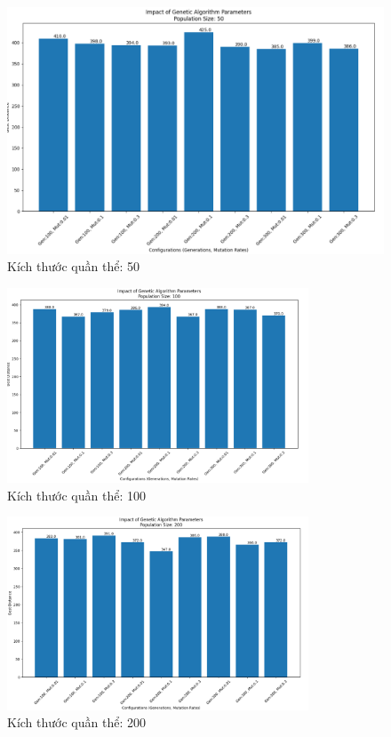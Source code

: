 \documentclass[14pt]{article}
\begin{document}
	\begin{center}
	 	\begin{figure}[htbp]
	 		\centering
	 		\includegraphics[width=\textwidth]{./Image/population_size_50.png}
	 		\caption{Kích thước quần thể: 50}
	 		\label{fig:mylabel}
	 	\end{figure}
	 	\begin{figure}[htbp]
	 		\centering
	 		\includegraphics[width=0.8\textwidth]{./Image/population_size_100.png}
	 		\caption{Kích thước quần thể: 100}
	 		\label{fig:mylabel}
	 	\end{figure}
		 \begin{figure}[htbp]
		 	\centering
		 	\includegraphics[width=0.8\textwidth]{./Image/population_size_200.png}
		 	\caption{Kích thước quần thể: 200}
		 	\label{fig:mylabel}
		 \end{figure}
	\end{center}
	\newpage
\end{document}
